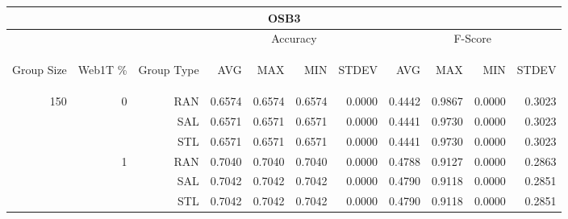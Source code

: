 \begin{center}
\begin{table}[htbp]
\begin{tabular}{ | r | r | r | r | r | r | r | r | r | r | r |}
\hline
\multicolumn{11}{|c|}{OSB3}\\
\hline
 & & & \multicolumn{4}{|c|}{Accuracy} & \multicolumn{4}{|c|}{F-Score}\\ \cline{4-11}
\begin{sideways}Group Size\end{sideways} & \begin{sideways}Web1T \%\end{sideways} & \begin{sideways}Group Type\end{sideways} & \begin{sideways}AVG\end{sideways} & \begin{sideways}MAX\end{sideways} & \begin{sideways}MIN\end{sideways} & \begin{sideways}STDEV\end{sideways} & \begin{sideways}AVG\end{sideways} & \begin{sideways}MAX\end{sideways} & \begin{sideways}MIN\end{sideways} & \begin{sideways}STDEV\end{sideways}\\
\hline
\multirow{18}{*}{150}
 & \multirow{3}{*}{0} & RAN & 0.6574 & 0.6574 & 0.6574 & 0.0000 & 0.4442 & 0.9867 & 0.0000 & 0.3023\\ \cline{3-11}
 &   & SAL & 0.6571 & 0.6571 & 0.6571 & 0.0000 & 0.4441 & 0.9730 & 0.0000 & 0.3023\\ \cline{3-11}
 &   & STL & 0.6571 & 0.6571 & 0.6571 & 0.0000 & 0.4441 & 0.9730 & 0.0000 & 0.3023\\ \cline{2-11}
 & \multirow{3}{*}{1} & RAN & 0.7040 & 0.7040 & 0.7040 & 0.0000 & 0.4788 & 0.9127 & 0.0000 & 0.2863\\ \cline{3-11}
 &   & SAL & 0.7042 & 0.7042 & 0.7042 & 0.0000 & 0.4790 & 0.9118 & 0.0000 & 0.2851\\ \cline{3-11}
 &   & STL & 0.7042 & 0.7042 & 0.7042 & 0.0000 & 0.4790 & 0.9118 & 0.0000 & 0.2851\\ \cline{2-11}

\end{tabular}
\end{table}
\end{center}
